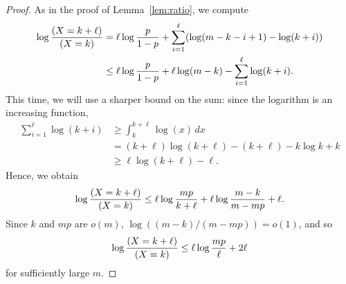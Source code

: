 \documentclass[EJP]{ejpecp}
\newcommand{\1}[1]{\mathbbm{1}_{\{#1\}}}
\let\Pr\relax
\DeclareMathOperator{\Pr}{Pr}
\begin{document}
\begin{proof}
 As in the proof of Lemma~\ref{lem:ratio}, we compute
 \begin{align*}
  \log \frac {\Pr(X = k + \ell)}{\Pr(X = k)}
  &= \ell \log \frac{p}{1-p} + \sum_{i=1}^\ell (\log(m-k-i+1) - \log(k+i)) \\
  &\le \ell \log \frac{p}{1-p} + \ell \log(m-k) - \sum_{i=1}^\ell \log(k+i).
 \end{align*}
 This time, we will use a sharper bound on the sum:
 since the logarithm is an increasing function,
 \begin{align*}
  \sum_{i=1}^\ell \log(k+i)
  &\ge \int_k^{k+\ell} \log(x) \, dx \\
  &= (k+\ell) \log(k+\ell) - (k+\ell) - k \log k + k \\
  &\ge \ell \log(k+\ell) - \ell.
 \end{align*}
 Hence, we obtain
 \[
  \log \frac {\Pr(X = k + \ell)}{\Pr(X = k)}
  \le \ell \log \frac{mp}{k+\ell} + \ell \log\frac{m-k}{m-mp} + \ell.
 \]
 Since $k$ and $mp$ are $o(m)$, $\log((m-k)/(m-mp)) = o(1)$,
 and so
 \[
  \log \frac {\Pr(X = k + \ell)}{\Pr(X = k)}
  \le \ell \log \frac{mp}{\ell} + 2\ell
 \]
 for sufficiently large $m$.
\end{proof}
\end{document}
